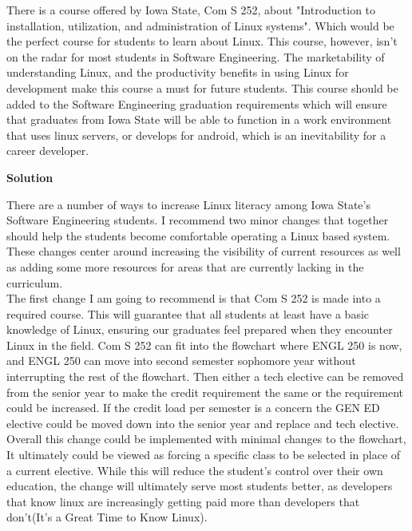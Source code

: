 \documentclass[11pt]{article}
\begin{document}
  \noindent There is a course offered by Iowa State, Com S 252, about "Introduction to installation, utilization, and administration of Linux systems". Which would be the perfect course
  for students to learn about Linux. This course, however, isn't on the radar for most students in Software Engineering. The marketability of understanding Linux, and the productivity benefits in using Linux for development
  make this course a must for future students. This course should be added to the Software Engineering graduation requirements which will ensure that graduates from Iowa State will be able to function
  in a work environment that uses linux servers, or develops for android, which is an inevitability for a career developer.

  \noindent\large{\textbf{Solution}}

  \noindent There are a number of ways to increase Linux literacy among Iowa State's Software Engineering students. I recommend two minor changes that
  together should help the students become comfortable operating a Linux based system. These changes center around increasing the visibility of current resources
  as well as adding some more resources for areas that are currently lacking in the curriculum.\\

  \noindent The first change I am going to recommend is that Com S 252 is made into a required course. This will guarantee that all students at least have a basic knowledge of Linux, ensuring our graduates feel prepared when they encounter Linux in the field. Com S 252 can fit into the flowchart where ENGL 250 is now, and ENGL 250 can move into second semester sophomore year without interrupting the rest of the flowchart. Then either a tech elective can be removed from the senior year to make the credit requirement the same or the requirement could be increased. If the credit load per semester is a concern the GEN ED elective could be moved down into the senior year and replace and tech elective. Overall this change could be implemented with minimal changes to the flowchart, It ultimately could be viewed as forcing a specific class to be selected in place of a current elective. While this will reduce the student's control over their own education,
  the change will ultimately serve most students better, as developers that know linux are increasingly getting paid more than developers that don't(It's a Great
  Time to Know Linux).\\
\end{document}
